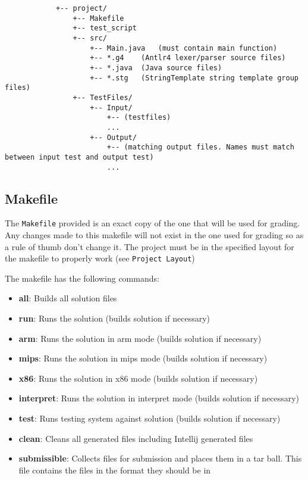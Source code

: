 \documentclass{article}
\begin{document}
		\begin{lstlisting}
			+-- project/
				+-- Makefile
				+-- test_script
				+-- src/
					+-- Main.java	(must contain main function)
					+-- *.g4	(Antlr4 lexer/parser source files)
					+-- *.java	(Java source files)
					+-- *.stg	(StringTemplate string template group files)
				+-- TestFiles/
					+-- Input/
						+-- (testfiles)
						...
					+-- Output/
						+-- (matching output files. Names must match between input test and output test)
						...
		\end{lstlisting}


	\subsection{Makefile}

		The \texttt{Makefile} provided is an exact copy of the one that will be used for grading.  Any changes made to
		this makefile will not exist in the one used for grading so as a rule of thumb don't change it. The project must
		be in the specified layout for the makefile to properly work (see \texttt{Project Layout})

		The makefile has the following commands:

		\begin{itemize}
			\item{\textbf{all}}: Builds all solution files
			\item{\textbf{run}}: Runs the solution (builds solution if necessary)
			\item{\textbf{arm}}: Runs the solution in arm mode (builds solution if necessary)
			\item{\textbf{mips}}: Runs the solution in mips mode (builds solution if necessary)
			\item{\textbf{x86}}: Runs the solution in x86 mode (builds solution if necessary)
			\item{\textbf{interpret}}: Runs the solution in interpret mode (builds solution if necessary)
			\item{\textbf{test}}: Runs testing system against solution (builds solution if necessary)
			\item{\textbf{clean}}: Cleans all generated files including Intellij generated files
			\item{\textbf{submissible}}: Collects files for submission and places them in a tar ball. This file contains
			the files in the format they should be in
		\end{itemize}
\end{document}
